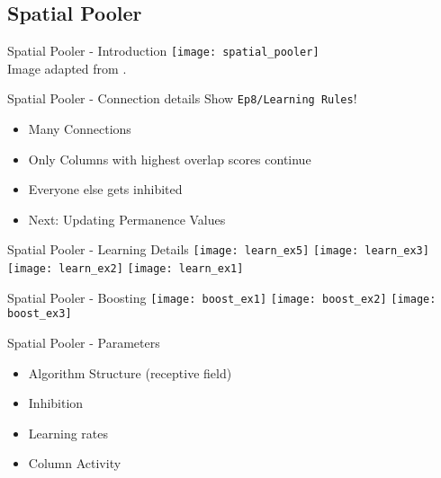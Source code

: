 \subsection{Spatial Pooler}


\begin{frame}[c]{Spatial Pooler - Introduction}
    \pause
    \texttt{[image: spatial\_pooler]} \\
    \normalsize
    Image adapted from \cite{cui2017htm}.
\end{frame}


\begin{frame}[c,fragile]{Spatial Pooler - Connection details}
    \Large
    Show \verb!Ep8/Learning Rules!!
    \newline
    \begin{itemize}[<+(1)->]
        \item Many Connections
        \item Only Columns with highest overlap scores continue
        \item Everyone else gets inhibited
        \item Next: Updating Permanence Values
    \end{itemize}
\end{frame}


\begin{frame}[c,allowframebreaks]{Spatial Pooler - Learning Details}
    \texttt{[image: learn\_ex5]}
    \texttt{[image: learn\_ex3]}
    \texttt{[image: learn\_ex2]}
    \texttt{[image: learn\_ex1]}
\end{frame}





\begin{frame}[c,allowframebreaks]{Spatial Pooler - Boosting}
    \texttt{[image: boost\_ex1]}
    \texttt{[image: boost\_ex2]}
    \texttt{[image: boost\_ex3]}
\end{frame}


\begin{frame}[c]{Spatial Pooler - Parameters}
    \Large
    \begin{itemize}[<+(1)->]
        \item Algorithm Structure (receptive field)
        \item Inhibition
        \item Learning rates
        \item Column Activity
    \end{itemize}
\end{frame}



